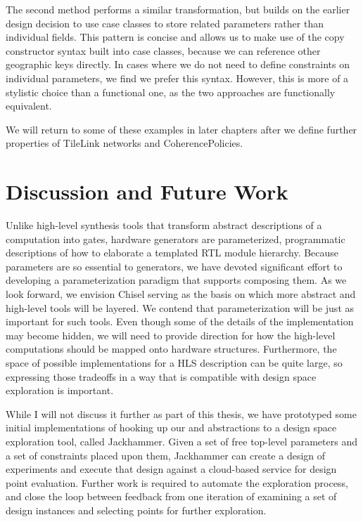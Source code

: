 The second method performs a similar transformation, but builds on the earlier design decision
to use case classes to store related parameters rather than individual fields.
This pattern is concise and allows us to make use of the copy constructor syntax built into case classes, because we
can reference other geographic keys directly.
In cases where we do not need to define constraints on individual parameters, we find we prefer this syntax.
However, this is more of a stylistic choice than a functional one, as the two approaches
are functionally equivalent.

We will return to some of these examples in later chapters after we define further properties of TileLink networks and CoherencePolicies.

\section{Discussion and Future Work}
\label{sec:con}

Unlike high-level synthesis tools that transform abstract descriptions of a computation into gates,
hardware generators are parameterized, programmatic descriptions of how to elaborate a templated RTL module hierarchy.
Because parameters are so essential to generators, we have devoted significant effort to
developing a parameterization paradigm that supports composing them.
As we look forward, we envision Chisel serving as the basis on which more abstract and high-level tools will be layered.
We contend that parameterization will be just as important for such tools.
Even though some of the details of the implementation may become hidden,
we will need to provide direction for how the high-level computations should be mapped
onto hardware structures.
Furthermore, the space of possible implementations for a HLS description can be quite large,
so expressing those tradeoffs in a way that is compatible with design space exploration is important.

While I will not discuss it further as part of this thesis, we have prototyped some initial implementations
of hooking up our  and  abstractions to a design space exploration tool, called Jackhammer.
Given a set of free top-level parameters and a set of constraints placed upon them, Jackhammer can create a design of experiments and
execute that design against a cloud-based service for design point evaluation.
Further work is required to automate the exploration process, and close the loop between feedback from one iteration of examining a
set of design instances and selecting points for further exploration.

